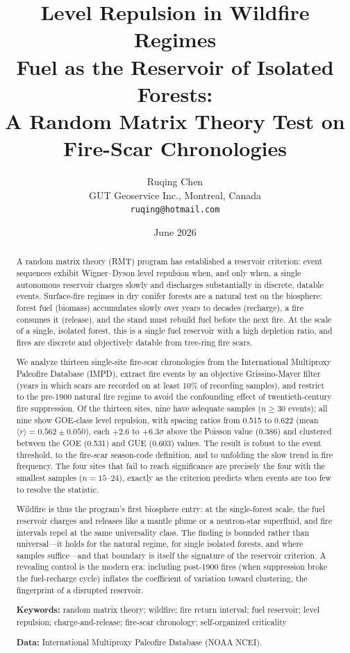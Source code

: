 \documentclass[12pt,a4paper]{article}
\title{\textbf{Level Repulsion in Wildfire Regimes}\\[0.4em]
{\large Fuel as the Reservoir of Isolated Forests:}\\
{\large A Random Matrix Theory Test on Fire-Scar Chronologies}}
\author{Ruqing Chen\\ GUT Geoservice Inc., Montreal, Canada\\ \texttt{ruqing@hotmail.com}}
\date{June 2026}
\begin{document}
\maketitle
\begin{abstract}
\noindent A random matrix theory (RMT) program has established a reservoir criterion: event sequences exhibit Wigner--Dyson level repulsion when, and only when, a single autonomous reservoir charges slowly and discharges substantially in discrete, datable events. Surface-fire regimes in dry conifer forests are a natural test on the biosphere: forest fuel (biomass) accumulates slowly over years to decades (recharge), a fire consumes it (release), and the stand must rebuild fuel before the next fire. At the scale of a single, isolated forest, this is a single fuel reservoir with a high depletion ratio, and fires are discrete and objectively datable from tree-ring fire scars.

We analyze thirteen single-site fire-scar chronologies from the International Multiproxy Paleofire Database (IMPD), extract fire events by an objective Grissino-Mayer filter (years in which scars are recorded on at least 10\% of recording samples), and restrict to the pre-1900 natural fire regime to avoid the confounding effect of twentieth-century fire suppression. Of the thirteen sites, nine have adequate samples ($n\ge30$ events); all nine show GOE-class level repulsion, with spacing ratios from 0.515 to 0.622 (mean $\langle r\rangle = 0.562 \pm 0.050$), each $+2.6$ to $+6.3\sigma$ above the Poisson value (0.386) and clustered between the GOE (0.531) and GUE (0.603) values. The result is robust to the event threshold, to the fire-scar season-code definition, and to unfolding the slow trend in fire frequency. The four sites that fail to reach significance are precisely the four with the smallest samples ($n=15$--$24$), exactly as the criterion predicts when events are too few to resolve the statistic.

Wildfire is thus the program's first biosphere entry: at the single-forest scale, the fuel reservoir charges and releases like a mantle plume or a neutron-star superfluid, and fire intervals repel at the same universality class. The finding is bounded rather than universal---it holds for the natural regime, for single isolated forests, and where samples suffice---and that boundary is itself the signature of the reservoir criterion. A revealing control is the modern era: including post-1900 fires (when suppression broke the fuel-recharge cycle) inflates the coefficient of variation toward clustering, the fingerprint of a disrupted reservoir.

\vspace{0.6em}
\noindent\textbf{Keywords:} random matrix theory; wildfire; fire return interval; fuel reservoir; level repulsion; charge-and-release; fire-scar chronology; self-organized criticality

\vspace{0.3em}
\noindent\textbf{Data:} International Multiproxy Paleofire Database (NOAA NCEI).
\end{abstract}
\end{document}
